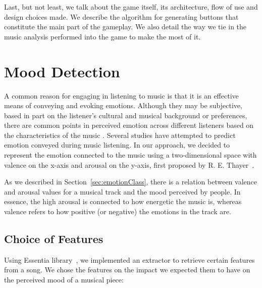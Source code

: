 Last, but not least, we talk about the game itself, its architecture, flow of use and design choices made. We describe the algorithm for generating buttons that constitute the main part of the gameplay. We also detail the way we tie in the music analysis performed into the game to make the most of it.

\vspace{20pt}

\section{Mood Detection}
\vspace{10pt}

A common reason for engaging in listening to music is that it is an effective means of conveying and evoking emotions. Although they may be subjective, based in part on the listener’s cultural and musical background or preferences, there are common points in perceived emotion across different listeners based on the characteristics of the music \cite{vempala}. Several studies have attempted to predict emotion conveyed during music listening. In our approach, we decided to represent the emotion connected to the music using a two-dimensional space with valence on the x-axis and arousal on the y-axis, first proposed by R. E. Thayer~\cite{Thayer}.

As we described in Section~\ref{sec:emotionClass}, there is a relation between valence and arousal values for a musical track and the mood perceived by people. In essence, the high arousal is connected to how energetic the music is, whereas valence refers to how positive (or negative) the emotions in the track are. 

\vspace{10pt}

\subsection{Choice of Features}
Using Essentia library~\cite{essentia}, we implemented an extractor to retrieve certain features from a song. We chose the features on the impact we expected them to have on the perceived mood of a musical piece:

